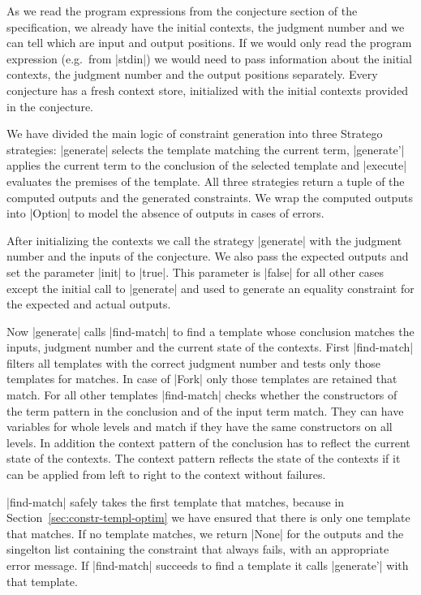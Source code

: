 As we read the program expressions from the conjecture section of the
specification, we already have the initial contexts, the judgment
number and we can tell which are input and output positions. If we
would only read the program expression (e.g.\ from \code|stdin|) we
would need to pass information about the initial contexts, the
judgment number and the output positions separately. Every conjecture
has a fresh context store, initialized with the initial contexts
provided in the conjecture.

We have divided the main logic of constraint generation into three
Stratego strategies: \code|generate| selects the template matching the
current term, \code|generate'| applies the current term to the
conclusion of the selected template and \code|execute| evaluates the
premises of the template. All three strategies return a tuple of the
computed outputs and the generated constraints. We wrap the computed
outputs into \code|Option| to model the absence of outputs in cases of
errors.

After initializing the contexts we call the strategy \code|generate|
with the judgment number and the inputs of the conjecture. We also
pass the expected outputs and set the parameter \code|init| to
\code|true|. This parameter is \code|false| for all other cases except
the initial call to \code|generate| and used to generate an equality
constraint for the expected and actual outputs.

Now \code|generate| calls \code|find-match| to find a template whose
conclusion matches the inputs, judgment number and the current state
of the contexts. First \code|find-match| filters all templates with
the correct judgment number and tests only those templates for
matches.  In case of
\code|Fork| only those templates are retained that match. For all
other templates \code|find-match| checks whether the constructors of
the term pattern in the conclusion and of the input term match. They
can have variables for whole levels and match if they have the same
constructors on all levels. In addition the context pattern of the
conclusion has to reflect the current state of the contexts. The
context pattern reflects the state of the contexts if it can be
applied from left to right to the context without failures.

\code|find-match| safely takes the first template that matches,
because in Section~\ref{sec:constr-templ-optim} we have ensured that
there is only one template that matches. If no template matches, we
return \code|None| for the outputs and the singelton list containing
the constraint that always fails, with an appropriate error
message. If \code|find-match| succeeds to find a template it calls
\code|generate'| with that template.

